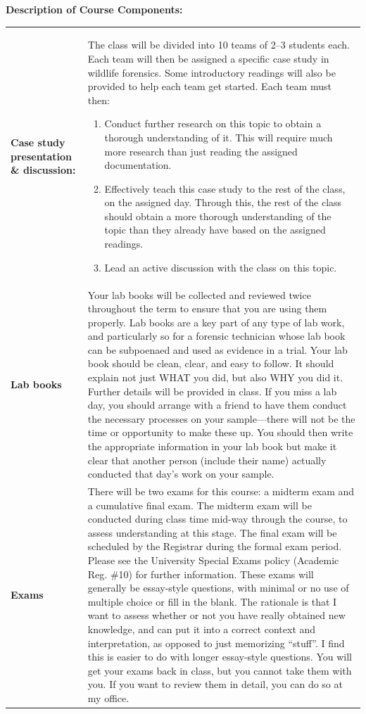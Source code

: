 \documentclass[hidelinks]{article}
\begin{document}
	\newpage
	\textbf{Description of Course Components:}
		\begin{table}[H]
			\begin{tabular}{@{} >{\raggedright}p{2.5cm} p{13.7cm}}
				\textbf{Case study presentation \& discussion:} & The class will be divided into 10 teams of 2--3 students each. Each team will then be assigned a specific case study in wildlife forensics. Some introductory readings will also be provided to help each team get started. Each team must then:
				\begin{enumerate}
					\item Conduct further research on this topic to obtain a thorough understanding of it. This will require much more research than just reading the assigned documentation.
					\item Effectively teach this case study to the rest of the class, on the assigned day. Through this, the rest of the class should obtain a more thorough understanding of the topic than they already have based on the assigned readings.
					\item Lead an active discussion with the class on this topic.
				\end{enumerate}\\
				\addlinespace
				\textbf{Lab books} & Your lab books will be collected and reviewed twice throughout the term to ensure that you are using them properly. Lab books are a key part of any type of lab work, and particularly so for a forensic technician whose lab book can be subpoenaed and used as evidence in a trial. Your lab book should be clean, clear, and easy to follow. It should explain not just WHAT you did, but also WHY you did it. Further details will be provided in class. If you miss a lab day, you should arrange with a friend to have them conduct the necessary processes on your sample---there will not be the time or opportunity to make these up. You should then write the appropriate information in your lab book but make it clear that another person (include their name) actually conducted that day's work on your sample.\\
				\addlinespace
				\textbf{Exams} & There will be two exams for this course: a midterm exam and a cumulative final exam. The midterm exam will be conducted during class time mid-way through the course, to assess understanding at this stage. The final exam will be scheduled by the Registrar during the formal exam period. Please see the University Special Exams policy (Academic Reg. \#10) for further information. These exams will generally be essay-style questions, with minimal or no use of multiple choice or fill in the blank. The rationale is that I want to assess whether or not you have really obtained new knowledge, and can put it into a correct context and interpretation, as opposed to just memorizing ``stuff''. I find this is easier to do with longer essay-style questions. You will get your exams back in class, but you cannot take them with you. If you want to review them in detail, you can do so at my office.\\

\end{tabular}
\end{table}
\end{document}
